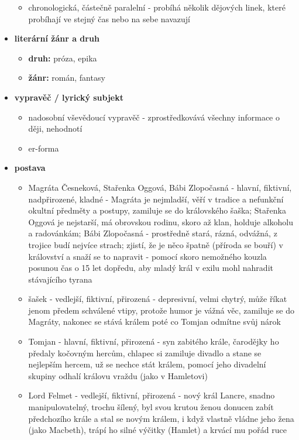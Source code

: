 \documentclass[11pt]{article}
\begin{document}
\begin{itemize}
\begin{itemize}
            \item chronologická, částečně paralelní - probíhá několik dějových linek, které probíhají ve stejný čas nebo na sebe navazují
        \end{itemize}
        \item\textbf{literární žánr a druh}
        \begin{itemize}
            \item\textbf{druh: }próza, epika
            \item\textbf{žánr: }román, fantasy
        \end{itemize}
        \item\textbf{vypravěč / lyrický subjekt}
        \begin{itemize}
            \item nadosobní vševědoucí vypravěč - zprostředkovává všechny informace o ději, nehodnotí
            \item er-forma
        \end{itemize}
        \item\textbf{postava}
        \begin{itemize}
            \item Magráta Česneková, Stařenka Oggová, Bábi Zlopočasná - hlavní, fiktivní, nadpřirozené, kladné - Magráta je nejmladší, věří v tradice a nefunkční okultní předměty a postupy, zamiluje se do královského šaška; Stařenka Oggová je nejstarší, má obrovskou rodinu, skoro až klan, holduje alkoholu a radovánkám; Bábi Zlopočasná - prostředně stará, rázná, odvážná, z trojice budí nejvíce strach; zjistí, že je něco špatně (příroda se bouří) v království a snaží se to napravit - pomocí skoro nemožného kouzla posunou čas o 15 let dopředu, aby mladý král v exilu mohl nahradit stávajícího tyrana
            \item šašek - vedlejší, fiktivní, přirozená - depresivní, velmi chytrý, může říkat jenom předem schválené vtipy, protože humor je vážná věc, zamiluje se do Magráty, nakonec se stává králem poté co Tomjan odmítne svůj nárok
            \item Tomjan - hlavní, fiktivní, přirozená - syn zabitého krále, čarodějky ho předaly kočovným hercům, chlapec si zamiluje divadlo a stane se nejlepším hercem, už se nechce stát králem, pomocí jeho divadelní skupiny odhalí královu vraždu (jako v Hamletovi)
            \item Lord Felmet - vedlejší, fiktivní, přirozená - nový král Lancre, snadno manipulovatelný, trochu šílený, byl svou krutou ženou donucen zabít předchozího krále a stal se novým králem, i když vlastně vládne jeho žena (jako Macbeth), trápí ho silné výčitky (Hamlet) a krvácí mu pořád ruce

\end{itemize}
\end{itemize}
\end{document}
